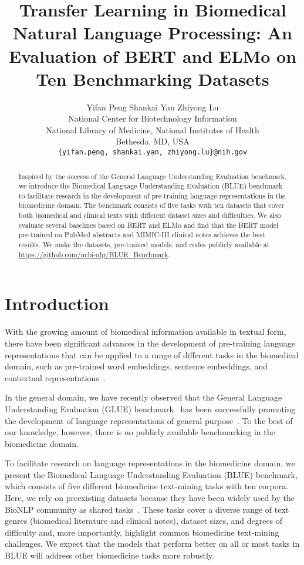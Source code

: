 \documentclass[11pt,a4paper]{article}
\title{Transfer Learning in Biomedical Natural Language Processing: 
An Evaluation of BERT and ELMo on Ten Benchmarking Datasets}
\author{Yifan Peng \hspace{1em} Shankai Yan \hspace{1em} Zhiyong Lu \\
  National Center for Biotechnology Information \\
  National Library of Medicine, National Institutes of Health \\
  Bethesda, MD, USA \\
  \texttt{\{yifan.peng, shankai.yan, zhiyong.lu\}@nih.gov}\\}
\date{}
\begin{document}
\maketitle
\begin{abstract}
Inspired by the success of the General Language Understanding Evaluation benchmark, we introduce the Biomedical Language Understanding Evaluation (BLUE) benchmark to facilitate research in the development of pre-training language representations in the biomedicine domain. The benchmark consists of five tasks with ten datasets that cover both biomedical and clinical texts with different dataset sizes and difficulties. We also evaluate several baselines based on BERT and ELMo and find that the BERT model pre-trained on PubMed abstracts and MIMIC-III clinical notes achieves the best results. We make the datasets, pre-trained models, and codes publicly available at \url{https://github.com/ncbi-nlp/BLUE_Benchmark}.
\end{abstract}

\section{Introduction}

With the growing amount of biomedical information available in textual form, there have been significant advances in the development of pre-training language representations that can be applied to a range of different tasks in the biomedical domain, such as pre-trained word embeddings, sentence embeddings, and contextual representations~\cite{chiu2016how,chen2018biosentvec,peters2017semi,lee2019biobert,smalheiser2019unsupervised}.

In the general domain, we have recently observed that the General Language Understanding Evaluation (GLUE) benchmark~\cite{wang2018glue} has been successfully promoting the development of language representations of general purpose~\cite{peters2017semi,radford2018improving,devlin2018bert}. To the best of our knowledge, however, there is no publicly available benchmarking in the biomedicine domain.

To facilitate research on language representations in the biomedicine domain, we present the Biomedical Language Understanding Evaluation (BLUE) benchmark, which consists of five different biomedicine text-mining tasks with ten corpora. Here, we rely on preexisting datasets because they have been widely used by the BioNLP community as shared tasks~\cite{huang2015community}. These tasks cover a diverse range of text genres (biomedical literature and clinical notes), dataset sizes, and degrees of difficulty and, more importantly, highlight common biomedicine text-mining challenges. We expect that the models that perform better on all or most tasks in BLUE will address other biomedicine tasks more robustly.  
\end{document}

